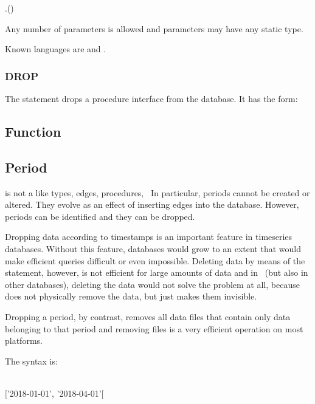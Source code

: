  .()
                            

Any number of parameters is allowed and parameters may have
any static type.

Known languages are  and .

\subsubsection{DROP}
The  statement
drops a procedure interface from the database.
It has the form:

 

\subsection{Function}

\subsection{Period}
 is not a 
like types, edges, procedures, \etc\
In particular, periods cannot be created or altered.
They evolve as an effect of inserting edges into
the database. However, periods can be identified
and they can be dropped.

Dropping data according to timestamps is an important
feature in timeseries databases.
Without this feature, databases would grow
to an extent that would make efficient queries difficult
or even impossible. Deleting data by means of the
 statement, however, is not efficient for large
amounts of data and in \nowdb\
(but also in other databases), deleting
the data would not solve the problem at all,
because \term{delete} does not physically remove
the data, but just makes them invisible.

Dropping a period, by contrast, removes all data files 
that contain only data belonging to that period and
removing files is a very efficient
operation on most platforms.

The syntax is:

\begin{minipage}{\textwidth}
  \\
 $[$'2018-01-01', '2018-04-01'$[$
\end{minipage}

